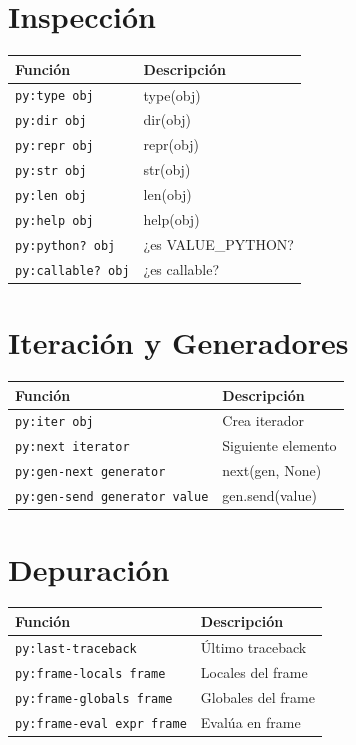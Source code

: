 \section*{Inspección}

\begin{center}
\begin{tabular}{ll}
\toprule
\textbf{Función} & \textbf{Descripción} \\
\midrule
\texttt{py:type obj} & type(obj) \\
\texttt{py:dir obj} & dir(obj) \\
\texttt{py:repr obj} & repr(obj) \\
\texttt{py:str obj} & str(obj) \\
\texttt{py:len obj} & len(obj) \\
\texttt{py:help obj} & help(obj) \\
\texttt{py:python? obj} & ¿es VALUE\_PYTHON? \\
\texttt{py:callable? obj} & ¿es callable? \\
\bottomrule
\end{tabular}
\end{center}

\section*{Iteración y Generadores}

\begin{center}
\begin{tabular}{ll}
\toprule
\textbf{Función} & \textbf{Descripción} \\
\midrule
\texttt{py:iter obj} & Crea iterador \\
\texttt{py:next iterator} & Siguiente elemento \\
\texttt{py:gen-next generator} & next(gen, None) \\
\texttt{py:gen-send generator value} & gen.send(value) \\
\bottomrule
\end{tabular}
\end{center}

\section*{Depuración}

\begin{center}
\begin{tabular}{ll}
\toprule
\textbf{Función} & \textbf{Descripción} \\
\midrule
\texttt{py:last-traceback} & Último traceback \\
\texttt{py:frame-locals frame} & Locales del frame \\
\texttt{py:frame-globals frame} & Globales del frame \\
\texttt{py:frame-eval expr frame} & Evalúa en frame \\
\bottomrule
\end{tabular}
\end{center}

